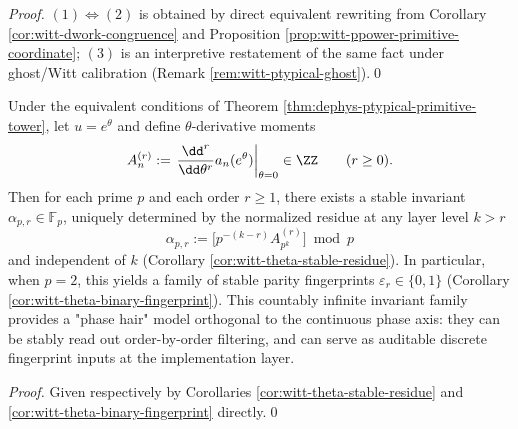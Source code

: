 \begin{proof}
\((1)\Leftrightarrow(2)\) is obtained by direct equivalent rewriting from Corollary \ref{cor:witt-dwork-congruence} and Proposition \ref{prop:witt-ppower-primitive-coordinate}; \((3)\) is an interpretive restatement of the same fact under ghost/Witt calibration (Remark \ref{rem:witt-ptypical-ghost}).\qed
\end{proof}

\begin{theorem}\label{thm:dephys-stable-residue-spectrum}
Under the equivalent conditions of Theorem \ref{thm:dephys-ptypical-primitive-tower}, let \(u=e^{\theta}\) and define \(\theta\)-derivative moments
\[
A_n^{(r)}:=\left.\frac{\dd^r}{\dd\theta^r}a_n(e^\theta)\right|_{\theta=0}\in\ZZ\qquad(r\ge 0).
\]
Then for each prime \(p\) and each order \(r\ge 1\), there exists a stable invariant \(\alpha_{p,r}\in\mathbb{F}_p\), uniquely determined by the normalized residue at any layer level \(k>r\)
\[
\alpha_{p,r}:=\bigl[p^{-(k-r)}A_{p^k}^{(r)}\bigr]\bmod p
\]
and independent of \(k\) (Corollary \ref{cor:witt-theta-stable-residue}).
In particular, when \(p=2\), this yields a family of stable parity fingerprints \(\varepsilon_r\in\{0,1\}\) (Corollary \ref{cor:witt-theta-binary-fingerprint}).
This countably infinite invariant family provides a "phase hair" model orthogonal to the continuous phase axis: they can be stably read out order-by-order filtering, and can serve as auditable discrete fingerprint inputs at the implementation layer.
\end{theorem}

\begin{proof}
Given respectively by Corollaries \ref{cor:witt-theta-stable-residue} and \ref{cor:witt-theta-binary-fingerprint} directly.\qed
\end{proof}

